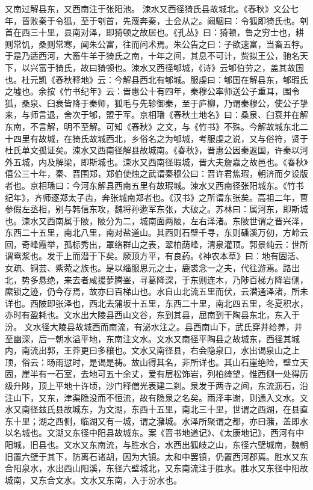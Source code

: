 \documentclass[12pt,UTF8]{ctexbook}
\begin{document}
又南过解县东，又西南注于张阳池。
涑水又西径猗氏县故城北。《春秋》文公七年，晋败秦于令狐，至于刳首，先蔑奔秦，士会从之。阚駰曰：令狐即猗氏也。刳首在西三十里，县南对泽，即猗顿之故居也。《孔丛》曰：猗顿，鲁之穷士也，耕则常饥，桑则常寒，闻朱公富，往而问术焉。朱公告之曰：子欲速富，当畜五牸。于是乃适西河，大畜牛羊于猗氏之南，十年之间，其息不可计，赀拟王公，驰名天下，以兴富于猗氏，故曰猗顿也。涑水又西径郇城，《诗》云郇伯劳之，盖其故国也。杜元凯《春秋释地》云：今解县西北有郇城。服虔曰：郇国在解县东，郇瑕氏之墟也。余按《竹书纪年》云：晋惠公十有四年，秦穆公率师送公子重耳，围令狐，桑泉、臼衰皆降于秦师，狐毛与先轸御秦，至于庐柳，乃谓秦穆公，使公子挚来，与师言退，舍次于郇，盟于军。京相璠《春秋土地名》曰：桑泉、臼衰并在解东南，不言解，明不至解。可知《春秋》之文，与《竹书》不殊。今解故城东北二十四里有故城，在猗氏故城西北，乡俗名之为郇城，考服虔之说，又与俗符，贤于杜氏单文孤证矣。涑水又西南径解县故城南。《春秋》，晋惠公因秦返国，许秦以河外五城，内及解梁，即斯城也。涑水又西南径瑕城，晋大夫詹嘉之故邑也。《春秋》僖公三十年，秦、晋围郑，郑伯使烛之武谓秦穆公曰：晋许君焦瑕，朝济而夕设版者也。京相璠曰：今河东解县西南五里有故瑕城。涑水又西南径张阳城东。《竹书纪年》，齐师逐郑太子齿，奔张城南郑者也。《汉书》之所谓东张矣。高祖二年，曹参假左丞相，别与韩信东攻，魏将孙遬军东张，大破之。苏林曰：属河东，即斯城也。涑水又西南属于陂，陂分为二，城南面两陂，左右泽渚。东陂世谓之晋兴泽，东西二十五里，南北八里，南对盐道山。其西则石壁千寻，东则磻溪万仞，方岭云回，奇峰霞举，孤标秀出，罩络群山之表，翠柏荫峰，清泉灌顶。郭景纯云：世所谓鸯浆也。发于上而潜于下矣。厥顶方平，有良药。《神农本草》曰：地有固活、女疏、铜芸、紫菀之族也。是以缁服思元之士，鹿裘念一之夫，代往游焉。路出北，势多悬绝，来去者咸援萝腾崟，寻葛降深，于东则连木，乃陟百梯方降岩侧，縻锁之迹，仍今存焉，故亦曰百梯山也。水自山北流五里而伏，云潜通泽渚，所未详也。西陂即张泽也，西北去蒲坂十五里，东西二十里，南北四五里，冬夏积水，亦时有盈耗也。文水出大陵县西山文谷，东到其县，屈南到干陶县东北，东入于汾。
文水径大陵县故城西而南流，有泌水注之。县西南山下，武氏穿井给养，井至幽深，后一朝水溢平地，东南注文水。文水又南径平陶县之故城东，西径其城内，南流出郭，王莽更曰多穰也。文水又南径县，右会隐泉口，水出谒泉山之上顶，俗云：旸雨愆时，是谒是祷。故山得其名，非所详也。其山石崖绝险，壁立天固，崖半有一石室，去地可五十余丈，爱有层松饰岩，列柏绮望，惟西侧一处得历级升陟，顶上平地十许顷，沙门释僧光表建二刹。泉发于两寺之间，东流沥石，沿注山下，又东，津渠隐没而不恒流，故有隐泉之名矣。雨泽丰谢，则通入文水。文水又南径兹氏县故城东，为文湖，东西十五里，南北三十里，世谓之西湖，在县直东十里；湖之西侧，临湖又有一城，谓之潴城。水泽所聚谓之都，亦曰潴，盖即水以名城也。文湖又东径中阳县故城东。案《晋书地道记》、《太康地记》，西河有中阳城，旧县也。文水又东南流，与胜水合，水西出狐岐之山，东径六壁城南，魏朝旧置六壁于其下，防离石诸胡，因为大镇。太和中罢镇，仍置西河郡焉。胜水又东合阳泉水，水出西山阳溪，东径六壁城北，又东南流注于胜水。胜水又东径中阳故城南，又东合文水。文水又东南，入于汾水也。
\end{document}
